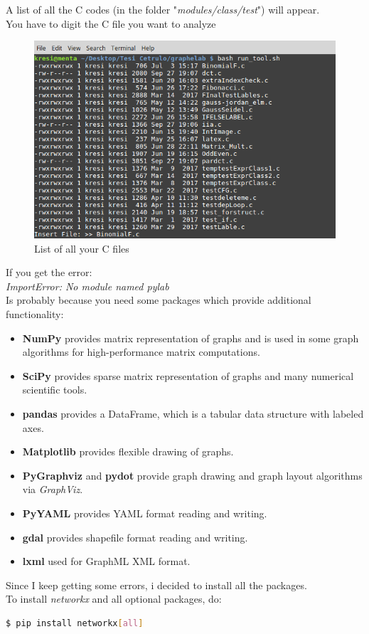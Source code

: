 A list of all the C codes (in the folder "\textit{modules/class/test}") will appear.\\
You have to digit the C file you want to analyze
	\begin{figure}[h]
		\centering
		\includegraphics[width=\textwidth]{imm/tessa/list_C.png}  
		\caption{List of all your C files}
		\label{listC}
	\end{figure}
If you get the error:\\
\textit{ImportError: No module named pylab}\\
Is probably because you need some packages which provide additional functionality:
\begin{itemize}
	\item \textbf{NumPy} provides matrix representation of
	graphs and is used in some graph algorithms for high-performance matrix
	computations.
	\item \textbf{SciPy} provides sparse matrix representation
	of graphs and many numerical scientific tools.
	\item \textbf{pandas} provides a DataFrame, which
	is a tabular data structure with labeled axes.
	\item \textbf{Matplotlib} provides flexible drawing of
	graphs.
	\item \textbf{PyGraphviz} and \textbf{pydot} provide graph drawing
	and graph layout algorithms via \textit{GraphViz}.
	\item \textbf{PyYAML} provides YAML format reading and writing.
	\item\textbf{ gdal} provides shapefile format reading and writing.
	\item \textbf{lxml} used for GraphML XML format.
\end{itemize}
Since I keep getting some errors, i decided to install all the packages.\\
To install \textit{networkx} and all optional packages, do:\\
\begin{lstlisting}[language=bash]
$ pip install networkx[all]
\end{lstlisting}

